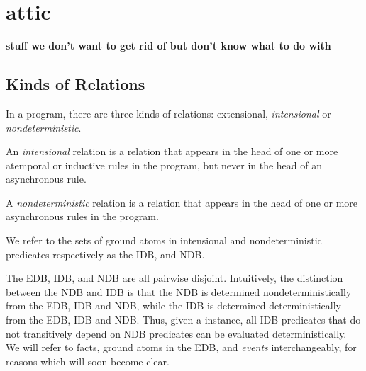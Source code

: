 \section{attic}

\textbf{stuff we don't want to get rid of but don't know what to do with}

\subsection{Kinds of Relations}
    
In a \lang program, there are three kinds of relations:
extensional, {\em intensional} or {\em nondeterministic}.

\begin{definition}
%
An \emph{intensional} relation is a relation that appears
in the head of one or more atemporal or inductive rules in the program, but
never in the head of an asynchronous rule.~
%
\end{definition}
\begin{definition}
%
A \emph{nondeterministic} relation is a relation that
appears in the head of one or more asynchronous rules in the program.
%
\end{definition}
We refer to the sets of ground atoms in intensional and nondeterministic
predicates respectively as the IDB, and NDB.

The EDB, IDB, and NDB are all pairwise disjoint.  Intuitively, the distinction
between the NDB and IDB is that the NDB is determined nondeterministically~ from
the EDB, IDB and NDB, while the IDB is determined deterministically from the
EDB, IDB and NDB.  Thus, given a \lang instance, all IDB predicates that do
not transitively depend on NDB predicates can be evaluated deterministically.
We will refer to facts, ground atoms in the EDB, and \emph{events}
interchangeably, for reasons which will soon become clear.

